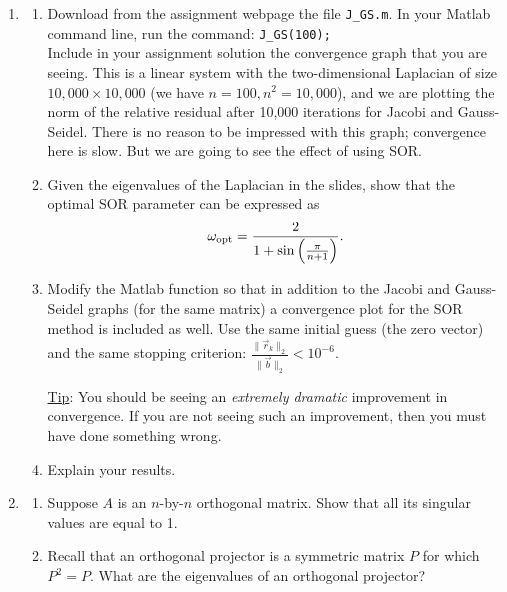 \documentclass[11pt]{article}
\newcommand{\bb}{\vec{b}}
\newcommand{\rr}{\vec{r}}
\begin{document}
\begin{enumerate}
\item 
\begin{enumerate}
\item Download from the assignment webpage the file {\tt J\_GS.m}. In your {\sc Matlab} command line, run the command: {\tt J\_GS(100);} \\
Include in your assignment solution the convergence graph that you are seeing. This is a linear system with the two-dimensional Laplacian of size $10,000 \times 10,000$ (we have $n=100, n^2=10,000$), and we are plotting the norm of the relative residual after 10,000 iterations for Jacobi and Gauss-Seidel. There is no reason to be impressed with this graph; convergence here is slow. But we are going to see  the effect of using SOR.
\item Given the eigenvalues of the Laplacian in the slides, show that the optimal SOR parameter can be expressed as
$$ \omega_{\rm opt} = \frac{2}{1+\sin \left( \frac{\pi}{n+1} \right)}.$$
\item
Modify the  {\sc Matlab} function so that in addition to the Jacobi and Gauss-Seidel graphs (for the same matrix) a convergence plot for the SOR method is included as well. Use the same initial guess (the zero vector) and the same stopping criterion: $\frac{\| \rr_k \|_2}{\| \bb \|_2} < 10^{-6}$. 

{\underline {Tip}:} You should be seeing an {\em extremely dramatic} improvement in convergence. If you are not seeing such an improvement, then you must have done something wrong.
\item Explain your results. 
\end{enumerate}

\item \begin{enumerate}
\item Suppose $A$ is an $n$-by-$n$ orthogonal matrix.
Show that all its singular values are equal to 1.
\item Recall that an orthogonal projector is a symmetric matrix $P$
for which $P^2=P$.
What are the eigenvalues of an orthogonal projector?
\end{enumerate}


\end{enumerate}
\end{document}
